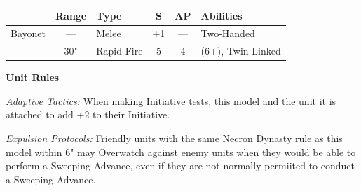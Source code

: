 \begin{minipage}[t]{0.72\textwidth}
	\begin{tabular}{L{90 pt} c C{40pt} *{2}{c} >{\raggedright\arraybackslash}p{130pt}}
		& Range & Type & S & AP & Abilities \\
		\hline
		Bayonet & — & Melee & +1 & — & Two-Handed \\
		 & 30" & Rapid Fire & 5 & 4 &  (6+), Twin-Linked \\	
	\end{tabular}

	
	\vspace*{2em}
	\textbf{Unit Rules}

	\textit{Adaptive Tactics:} When making Initiative tests, this model and the unit it is attached to add +2 to their Initiative.

	\textit{Expulsion Protocols:} Friendly units with the same Necron Dynasty rule as this model within 6" may Overwatch against enemy units when they would be able to perform a Sweeping Advance, even if they are not normally permiited to conduct a Sweeping Advance.

\end{minipage}
\hspace{0.5em}



\newpage
\subsubsection[Vargard]{}

